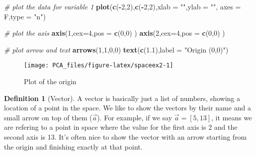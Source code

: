 \documentclass[
]{book}
\newenvironment{Shaded}{\begin{snugshade}}{\end{snugshade}}
\newcommand{\CommentTok}[1]{\textcolor[rgb]{0.56,0.35,0.01}{\textit{#1}}}
\newcommand{\DataTypeTok}[1]{\textcolor[rgb]{0.13,0.29,0.53}{#1}}
\newcommand{\DecValTok}[1]{\textcolor[rgb]{0.00,0.00,0.81}{#1}}
\newcommand{\FloatTok}[1]{\textcolor[rgb]{0.00,0.00,0.81}{#1}}
\newcommand{\KeywordTok}[1]{\textcolor[rgb]{0.13,0.29,0.53}{\textbf{#1}}}
\newcommand{\NormalTok}[1]{#1}
\newcommand{\OperatorTok}[1]{\textcolor[rgb]{0.81,0.36,0.00}{\textbf{#1}}}
\newcommand{\StringTok}[1]{\textcolor[rgb]{0.31,0.60,0.02}{#1}}
\theoremstyle{definition}
\newtheorem{definition}{Definition}[chapter]
\theoremstyle{definition}
\theoremstyle{definition}
\theoremstyle{remark}
\begin{document}
\begin{Shaded}
\begin{Highlighting}[]
\CommentTok{# plot the data for variable 1}
\KeywordTok{plot}\NormalTok{(}\KeywordTok{c}\NormalTok{(}\OperatorTok{-}\DecValTok{2}\NormalTok{,}\DecValTok{2}\NormalTok{),}\KeywordTok{c}\NormalTok{(}\OperatorTok{-}\DecValTok{2}\NormalTok{,}\DecValTok{2}\NormalTok{),}\DataTypeTok{xlab =} \StringTok{""}\NormalTok{,}\DataTypeTok{ylab =} \StringTok{""}\NormalTok{,}
 \DataTypeTok{axes =}\NormalTok{ F,}\DataTypeTok{type =} \StringTok{"n"}\NormalTok{)}

\CommentTok{# plot the axis}
\KeywordTok{axis}\NormalTok{(}\DecValTok{1}\NormalTok{,}\DataTypeTok{cex=}\DecValTok{4}\NormalTok{,}\DataTypeTok{pos =} \KeywordTok{c}\NormalTok{(}\DecValTok{0}\NormalTok{,}\DecValTok{0}\NormalTok{) )}
\KeywordTok{axis}\NormalTok{(}\DecValTok{2}\NormalTok{,}\DataTypeTok{cex=}\DecValTok{4}\NormalTok{,}\DataTypeTok{pos =} \KeywordTok{c}\NormalTok{(}\DecValTok{0}\NormalTok{,}\DecValTok{0}\NormalTok{) )}

\CommentTok{# plot arrow and text}
\KeywordTok{arrows}\NormalTok{(}\DecValTok{1}\NormalTok{,}\DecValTok{1}\NormalTok{,}\DecValTok{0}\NormalTok{,}\DecValTok{0}\NormalTok{)}
\KeywordTok{text}\NormalTok{(}\KeywordTok{c}\NormalTok{(}\FloatTok{1.1}\NormalTok{),}\DataTypeTok{label =} \StringTok{"Origin (0,0)"}\NormalTok{)}
\end{Highlighting}
\end{Shaded}

\begin{figure}

{\centering \texttt{[image: PCA\_files/figure-latex/spaceex2-1]} 

}

\caption{Plot of the origin}\label{fig:spaceex2}
\end{figure}

\begin{definition}[Vector]
\protect\hypertarget{def:vectors}{}{\label{def:vectors} \iffalse (Vector) \fi{} }A vector is basically just a list of numbers, showing a location of a point in the space. We like to show the vectors by their name and a small arrow on top of them (\(\vec{a}\)). For example, if we say \(\vec{a}=[5,13]\), it means we are refering to a point in space where the value for the first axis is 2 and the second axis is 13. It's often nice to show the vector with an arrow starting from the origin and finishing exactly at that point.
\end{definition}
\end{document}
